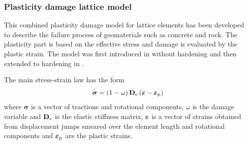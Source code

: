 \documentclass[a4paper]{article}
\begin{document}
\subsubsection{Plasticity damage lattice model}

This combined plasticity damage model for lattice elements has been developed to describe the failure process of geomaterials such as concrete and rock. The plasticity part is based on the effective stress and damage is evaluated by the plastic strain. The model was first introduced in \cite{GraDav11} without hardening and then extended to hardening in \cite{AthWheGra18}.

The main stress-strain law has the form
\begin{equation}
\boldsymbol{\sigma} = \left(1-\omega\right) \mathbf{D}_{\rm e} \left(\boldsymbol{\varepsilon}-\boldsymbol{\varepsilon}_{\rm p} \right)
\end{equation}
where $\boldsymbol{\sigma}$ is a vector of tractions and rotational components, $\omega$ is the damage variable and $\mathbf{D}_{\rm e}$ is the elastic stiffness matrix, $\boldsymbol{\varepsilon}$ is a vector of strains obtained from displacement jumps smeared over the element length and rotational components and $\boldsymbol{\varepsilon}_{\rm p}$ are the plastic strains.
\end{document}

